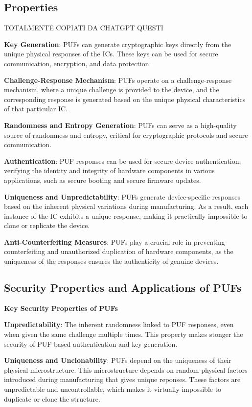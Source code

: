 \documentclass{article}
\begin{document}
\subsection{Properties} TOTALMENTE COPIATI DA CHATGPT QUESTI

\textbf{Key Generation}: PUFs can generate cryptographic keys directly from the unique physical responses of the ICs. These keys can be used for secure communication, encryption, and data protection.

\textbf{Challenge-Response Mechanism}: PUFs operate on a challenge-response mechanism, where a unique challenge is provided to the device, and the corresponding response is generated based on the unique physical characteristics of that particular IC.

\textbf{Randomness and Entropy Generation}: PUFs can serve as a high-quality source of randomness and entropy, critical for cryptographic protocols and secure communication.

\textbf{Authentication}: PUF responses can be used for secure device authentication, verifying the identity and integrity of hardware components in various applications, such as secure booting and secure firmware updates.

\textbf{Uniqueness and Unpredictability}: PUFs generate device-specific responses based on the inherent physical variations during manufacturing. As a result, each instance of the IC exhibits a unique response, making it practically impossible to clone or replicate the device.

\textbf{Anti-Counterfeiting Measures}: PUFs play a crucial role in preventing counterfeiting and unauthorized duplication of hardware components, as the uniqueness of the responses ensures the authenticity of genuine devices.


\subsection{Security Properties and Applications of PUFs}

\textbf{Key Security Properties of PUFs}

\textbf{Unpredictability}: The inherent randomness linked to  PUF responses, even when given the same challenge multiple times. This property makes stonger the security of PUF-based authentication and key generation.


\textbf{Uniqueness and Unclonability}: PUFs depend on the uniqueness of their physical microstructure. This microstructure depends on random physical factors introduced during manufacturing that gives unique reponses. These factors are unpredictable and uncontrollable, which makes it virtually impossible to duplicate or clone the structure.
\end{document}

